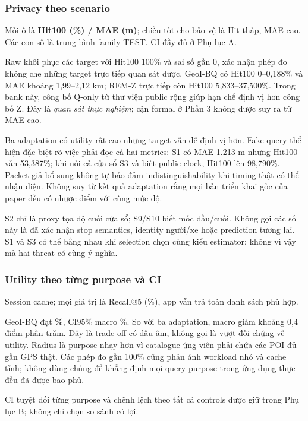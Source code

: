 \subsubsection{Privacy theo scenario}
Mỗi ô là \textbf{Hit100 (\%) / MAE (m)}; chiều tốt cho bảo vệ là Hit thấp, MAE cao.
Các con số là trung bình family TEST. CI đầy đủ ở Phụ lục A.
\begin{small}\end{small}

Raw khôi phục các target với Hit100 100\% và sai số gần 0, xác nhận phép đo không che những target trực tiếp
quan sát được. GeoI-BQ có Hit100 0--0,188\% và MAE khoảng 1,99--2,12 km; REM-Z trực tiếp còn Hit100
5,833--37,500\%. Trong bank này, công bố Q-only từ thư viện public rộng giúp hạn chế định vị hơn công bố Z.
Đây là \emph{quan sát thực nghiệm}; cận formal ở Phần 3 không được suy ra từ MAE cao.

Ba adaptation có utility rất cao nhưng target vẫn dễ định vị hơn. Fake-query thể hiện đặc biệt rõ việc phải
đọc cả hai metrics: S1 có MAE 1.213 m nhưng Hit100 vẫn 53,387\%; khi nối cả cửa sổ S3 và biết public clock,
Hit100 lên 98,790\%. Packet giả bổ sung không tự bảo đảm indistinguishability khi timing thật có thể nhận diện.
Không suy từ kết quả adaptation rằng mọi bản triển khai gốc của paper đều có nhược điểm với cùng mức độ.

S2 chỉ là proxy tọa độ cuối cửa sổ; S9/S10 biết mốc đầu/cuối. Không gọi các số này là đã xác nhận stop semantics,
identity người/xe hoặc prediction tương lai. S1 và S3 có thể bằng nhau khi selection chọn cùng kiểu estimator;
không vì vậy mà hai threat có cùng ý nghĩa.

\subsubsection{Utility theo từng purpose và CI}
Session cache; mọi giá trị là Recall@5 (\%), app vẫn trả toàn danh sách phù hợp.
\begin{small}\end{small}
GeoI-BQ đạt \textbf{\PrimaryRecall\%}, CI95\% macro \PrimaryCI\%.
So với ba adaptation, macro giảm khoảng 0,4 điểm phần trăm. Đây là trade-off có dấu âm, không gọi là
vượt đối chứng về utility. Radius là purpose nhạy hơn vì catalogue ứng viên phải chứa các POI đủ gần GPS thật.
Các phép đo gần 100\% cũng phản ánh workload nhỏ và cache tĩnh; không dùng chúng để khẳng định mọi
query purpose trong ứng dụng thực đều đã được bao phủ.

CI tuyệt đối từng purpose và chênh lệch theo tất cả controls được giữ trong Phụ lục B;
không chỉ chọn so sánh có lợi.

